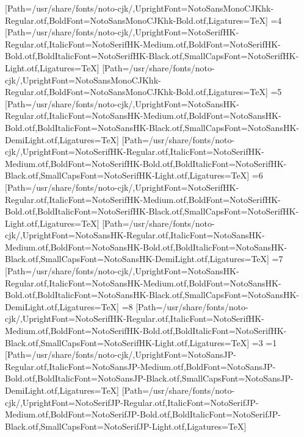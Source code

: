 [Path=/usr/share/fonts/noto-cjk/,UprightFont=NotoSansMonoCJKhk-Regular.otf,BoldFont=NotoSansMonoCJKhk-Bold.otf,Ligatures=TeX]
\else\ifnum\value{CJKFonts}=4
[Path=/usr/share/fonts/noto-cjk/,UprightFont=NotoSerifHK-Regular.otf,ItalicFont=NotoSerifHK-Medium.otf,BoldFont=NotoSerifHK-Bold.otf,BoldItalicFont=NotoSerifHK-Black.otf,SmallCapsFont=NotoSerifHK-Light.otf,Ligatures=TeX]
[Path=/usr/share/fonts/noto-cjk/,UprightFont=NotoSansMonoCJKhk-Regular.otf,BoldFont=NotoSansMonoCJKhk-Bold.otf,Ligatures=TeX]
\else\ifnum\value{CJKFonts}=5
[Path=/usr/share/fonts/noto-cjk/,UprightFont=NotoSansHK-Regular.otf,ItalicFont=NotoSansHK-Medium.otf,BoldFont=NotoSansHK-Bold.otf,BoldItalicFont=NotoSansHK-Black.otf,SmallCapsFont=NotoSansHK-DemiLight.otf,Ligatures=TeX]
[Path=/usr/share/fonts/noto-cjk/,UprightFont=NotoSerifHK-Regular.otf,ItalicFont=NotoSerifHK-Medium.otf,BoldFont=NotoSerifHK-Bold.otf,BoldItalicFont=NotoSerifHK-Black.otf,SmallCapsFont=NotoSerifHK-Light.otf,Ligatures=TeX]
\else\ifnum\value{CJKFonts}=6
[Path=/usr/share/fonts/noto-cjk/,UprightFont=NotoSerifHK-Regular.otf,ItalicFont=NotoSerifHK-Medium.otf,BoldFont=NotoSerifHK-Bold.otf,BoldItalicFont=NotoSerifHK-Black.otf,SmallCapsFont=NotoSerifHK-Light.otf,Ligatures=TeX]
[Path=/usr/share/fonts/noto-cjk/,UprightFont=NotoSansHK-Regular.otf,ItalicFont=NotoSansHK-Medium.otf,BoldFont=NotoSansHK-Bold.otf,BoldItalicFont=NotoSansHK-Black.otf,SmallCapsFont=NotoSansHK-DemiLight.otf,Ligatures=TeX]
\else\ifnum\value{CJKFonts}=7
[Path=/usr/share/fonts/noto-cjk/,UprightFont=NotoSansHK-Regular.otf,ItalicFont=NotoSansHK-Medium.otf,BoldFont=NotoSansHK-Bold.otf,BoldItalicFont=NotoSansHK-Black.otf,SmallCapsFont=NotoSansHK-DemiLight.otf,Ligatures=TeX]
\else\ifnum\value{CJKFonts}=8
[Path=/usr/share/fonts/noto-cjk/,UprightFont=NotoSerifHK-Regular.otf,ItalicFont=NotoSerifHK-Medium.otf,BoldFont=NotoSerifHK-Bold.otf,BoldItalicFont=NotoSerifHK-Black.otf,SmallCapsFont=NotoSerifHK-Light.otf,Ligatures=TeX]
\fi\fi\fi\fi\fi\fi\fi\fi\else
\ifnum\value{CJKLanguage}=3
\ifnum\value{CJKFonts}=1
[Path=/usr/share/fonts/noto-cjk/,UprightFont=NotoSansJP-Regular.otf,ItalicFont=NotoSansJP-Medium.otf,BoldFont=NotoSansJP-Bold.otf,BoldItalicFont=NotoSansJP-Black.otf,SmallCapsFont=NotoSansJP-DemiLight.otf,Ligatures=TeX]
[Path=/usr/share/fonts/noto-cjk/,UprightFont=NotoSerifJP-Regular.otf,ItalicFont=NotoSerifJP-Medium.otf,BoldFont=NotoSerifJP-Bold.otf,BoldItalicFont=NotoSerifJP-Black.otf,SmallCapsFont=NotoSerifJP-Light.otf,Ligatures=TeX]

